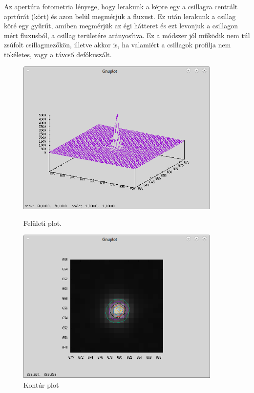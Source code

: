\documentclass{article}
\begin{document}
Az apertúra fotometria lényege, hogy lerakunk a képre egy a csillagra centrált
aprtúrát (kört) és azon belül megmérjük a fluxust. Ez után lerakunk a csillag
köré egy gyűrűt, amiben megmérjük az égi hátteret és ezt levonjuk a csillagon
mért fluxusból, a csillag területére arányosítva.
Ez a módszer jól működik nem túl zsúfolt csillagmezőkön, illetve akkor is, ha
valamiért a csillagok profilja nem tökéletes, vagy a távcső defókuszált.

\begin{figure}[ht!]
    \centering
    \begin{minipage}{0.45\textwidth}
        \centering
        \includegraphics[width=0.9\textwidth]{pics/surface.png} %
        \caption{Felületi plot.}
        \label{surfaceplot}
    \end{minipage}\hfill
    \begin{minipage}{0.45\textwidth}
        \centering
        \includegraphics[width=0.9\textwidth]{pics/area.png} %
        \caption{Kontúr plot}
        \label{areap}
    \end{minipage}
\end{figure}
\end{document}
